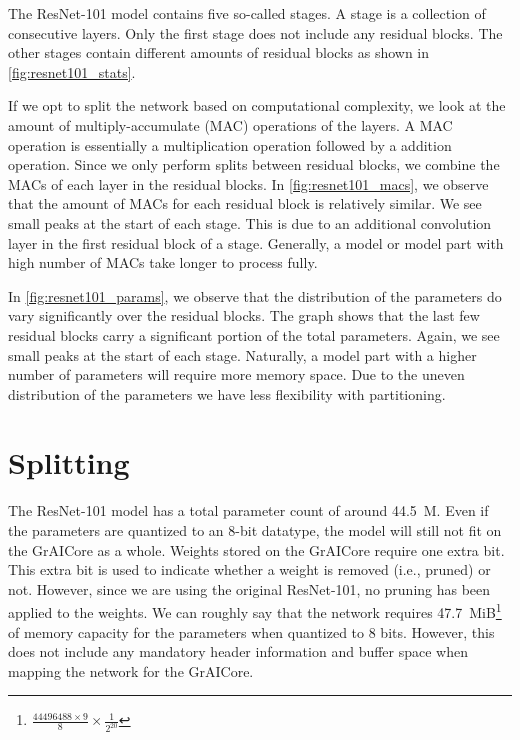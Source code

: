 The ResNet-101 model contains five so-called stages.
A stage is a collection of consecutive layers.
Only the first stage does not include any residual blocks.
The other stages contain different amounts of residual blocks as shown in \cref{fig:resnet101_stats}.

If we opt to split the network based on computational complexity, we look at the amount of multiply-accumulate (MAC) operations of the layers.
A MAC operation is essentially a multiplication operation followed by a addition operation.
Since we only perform splits between residual blocks, we combine the MACs of each layer in the residual blocks.
In \cref{fig:resnet101_macs}, we observe that the amount of MACs for each residual block is relatively similar.
We see small peaks at the start of each stage.
This is due to an additional convolution layer in the first residual block of a stage.
Generally, a model or model part with high number of MACs take longer to process fully.

In \cref{fig:resnet101_params}, we observe that the distribution of the parameters do vary significantly over the residual blocks.
The graph shows that the last few residual blocks carry a significant portion of the total parameters.
Again, we see small peaks at the start of each stage.
Naturally, a model part with a higher number of parameters will require more memory space.
Due to the uneven distribution of the parameters we have less flexibility with partitioning. 

\section{Splitting}
The ResNet-101 model has a total parameter count of around \SI{44.5}{M}.
Even if the parameters are quantized to an 8-bit datatype, the model will still not fit on the GrAICore as a whole.
Weights stored on the GrAICore require one extra bit.
This extra bit is used to indicate whether a weight is removed (i.e., pruned) or not.
However, since we are using the original ResNet-101, no pruning has been applied to the weights.
We can roughly say that the network requires \SI{47.7}{MiB}\footnote{$\frac{\num{44496488} \times 9}{8} \times \frac{1}{2^{20}}$} of memory capacity for the parameters when quantized to 8 bits.
However, this does not include any mandatory header information and buffer space when mapping the network for the GrAICore. 

